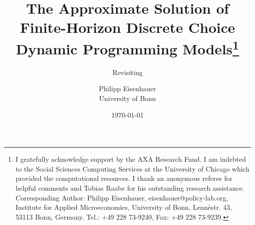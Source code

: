 \title{The Approximate Solution of Finite-Horizon Discrete Choice Dynamic Programming Models\thanks{I gratefully acknowledge support by the AXA Research Fund. I am indebted to the Social Sciences Computing Services at the University of Chicago which provided the computational resources. I thank an anonymous referee for helpful comments and Tobias Raabe for his outstanding research assistance. Corresponding Author: Philipp Eisenhauer, eisenhauer@policy-lab.org, Institute for Applied Microeconomics, University of Bonn, Lenn\'{e}str. 43, 53113 Bonn, Germany. Tel.: +49 228 73-9240, Fax: +49 228 73-9239.}}
\subtitle{Revisiting  \citet{Keane.1994}}

\author{Philipp Eisenhauer\\
University of Bonn}
\date{\today}
